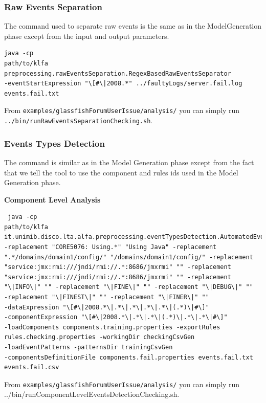 \subsubsection*{Raw Events Separation}

The command used to separate raw events is the same as in the ModelGeneration
phase except from the input and output parameters.


\begin{verbatim}
java -cp
path/to/klfa
preprocessing.rawEventsSeparation.RegexBasedRawEventsSeparator 
-eventStartExpression "\[#\|2008.*" ../faultyLogs/server.fail.log
events.fail.txt
\end{verbatim}

From \texttt{examples/glassfishForumUserIssue/analysis/} you can simply run
\texttt{../bin/run\-RawEventsSeparationChecking.sh}.

\subsubsection*{Events Types Detection}

The command is similar as in the Model Generation phase except from
the fact that we tell the tool to use the component and rules ids
used in the Model Generation phase. 

\textbf{Component Level Analysis}
\begin{verbatim}
 java -cp
path/to/klfa
it.unimib.disco.lta.alfa.preprocessing.eventTypesDetection.AutomatedEventTypesDetector
-replacement "CORE5076: Using.*" "Using Java" -replacement
".*/domains/domain1/config/" "/domains/domain1/config/" -replacement
"service:jmx:rmi:///jndi/rmi://.*:8686/jmxrmi" "" -replacement
"service:jmx:rmi:///jndi/rmi://.*:8686/jmxrmi" "" -replacement
"\|INFO\|" "" -replacement "\|FINE\|" "" -replacement "\|DEBUG\|" ""
-replacement "\|FINEST\|" "" -replacement "\|FINER\|" ""
-dataExpression "\[#\|2008.*\|.*\|.*\|.*\|.*\|(.*)\|#\]"
-componentExpression "\[#\|2008.*\|.*\|.*\|(.*)\|.*\|.*\|#\]" 
-loadComponents components.training.properties -exportRules
rules.checking.properties -workingDir checkingCsvGen
-loadEventPatterns -patternsDir trainingCsvGen
-componentsDefinitionFile components.fail.properties events.fail.txt
events.fail.csv

\end{verbatim}

From \texttt{examples/glassfishForumUserIssue/analysis/} you can simply run
../bin/runComponentLevelEventsDetectionChecking.sh.

